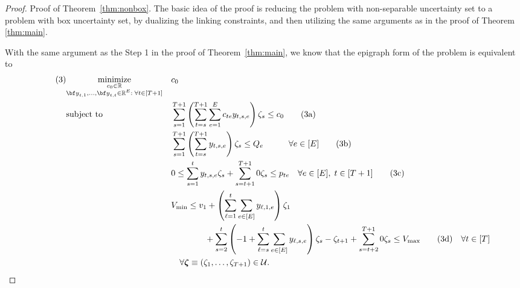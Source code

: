 \documentclass[nonblindrev,mnsc]{informs3} %
\newcommand{\by}{{\bf y}}
\newcommand{\bzeta}{{\boldsymbol{\zeta}}}
\def\Real{\mathbb{R}}
\let\R\Real
\begin{document}
\begin{APPENDICES}
\begin{proof}{Proof of Theorem~\ref{thm:nonbox}.}
The basic idea of the proof is reducing the problem with non-separable uncertainty set to a problem with box uncertainty set, by dualizing the linking constraints, and then utilizing the same arguments as in the proof of Theorem \ref{thm:main}.

With the same argument as the Step 1 in the proof of Theorem~\ref{thm:main}, we know that the epigraph form of the problem is equivalent to
    \begin{align}\label{budget} \tag{3}
   & \underset{\substack{c_0 \in \R \\\by_{t,1},\ldots,\by_{t,t} \in \R^E:\;  \forall t \in [T+1]}}{\textnormal{minimize}}&&c_0  \notag \\ 
    &\textnormal{subject to}&& \sum_{s=1}^{T +1}  \left( \sum_{t=s}^{T+1} \sum_{e=1}^E c_{te} y_{t,s,e} \right)  \zeta_s \le c_0 \tag{3a} \label{4-a} \\
    &&&\sum_{s=1}^{T+1} \left( \sum_{t=s}^{T+1} y_{t,s,e} \right) \zeta_s \le  Q_e \quad \quad \quad   \forall e \in[E] \tag{3b} \label{4-b} \\
   &&& 0 \le  \sum_{s=1}^{t}  y_{t,s,e} \zeta_s + \sum_{s=t+1}^{T+1} 0 \zeta_s \le  p_{te} \quad \forall  e\in[E],\; t \in [T+1] \tag{3c} \label{4-c}\\
   &&&V_{\textnormal{min}} \le  v_1 + \left( \sum_{\ell=1}^t \sum_{e \in [E]} y_{\ell,1,e} \right) \zeta_1 \nonumber \\
   &&& \quad \quad \quad \quad + \sum_{s=2}^t \left(-1 + \sum_{\ell=s}^t \sum_{e \in [E]} y_{\ell,s,e} \right) \zeta_s - \zeta_{t+1} + \sum_{s=t+2}^{T+1} 0 \zeta_s  \le  V_{\textnormal{max}} \tag{3d} \label{4-d}\quad  \forall  t \in [T]\\
   &&& \quad \forall \bzeta \equiv (\zeta_1,\ldots,\zeta_{T+1})\in \mathcal{U}.\nonumber
    \end{align}


\end{proof}
\end{APPENDICES}
\end{document}
